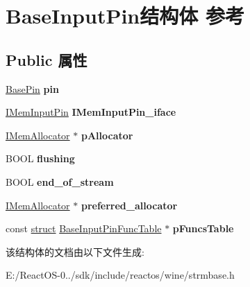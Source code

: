 \hypertarget{struct_base_input_pin}{}\section{Base\+Input\+Pin结构体 参考}
\label{struct_base_input_pin}
\subsection*{Public 属性}
\begin{DoxyCompactItemize}
\item 
\mbox{\label{struct_base_input_pin_a3de1d8566cbad1f616175c5020dbbc4a}} 
\hyperlink{struct_base_pin}{Base\+Pin} {\bfseries pin}
\item 
\mbox{\label{struct_base_input_pin_a3a11d5f666afddc2a5eb54845288313f}} 
\hyperlink{interface_i_mem_input_pin}{I\+Mem\+Input\+Pin} {\bfseries I\+Mem\+Input\+Pin\+\_\+iface}
\item 
\mbox{\label{struct_base_input_pin_a6877ac386361d331814f91efa5c76ed5}} 
\hyperlink{interface_i_mem_allocator}{I\+Mem\+Allocator} $\ast$ {\bfseries p\+Allocator}
\item 
\mbox{\label{struct_base_input_pin_adf5a3a9c33243a0f1f62c09ab4daf905}} 
B\+O\+OL {\bfseries flushing}
\item 
\mbox{\label{struct_base_input_pin_a30c49815eab0d0948d35e2f7f26a821b}} 
B\+O\+OL {\bfseries end\+\_\+of\+\_\+stream}
\item 
\mbox{\label{struct_base_input_pin_a60c23b915150b97c677b4dcbc3736e22}} 
\hyperlink{interface_i_mem_allocator}{I\+Mem\+Allocator} $\ast$ {\bfseries preferred\+\_\+allocator}
\item 
\mbox{\label{struct_base_input_pin_a1ea6f98369c04964e5689c30312525ba}} 
const \hyperlink{interfacestruct}{struct} \hyperlink{struct_base_input_pin_func_table}{Base\+Input\+Pin\+Func\+Table} $\ast$ {\bfseries p\+Funcs\+Table}
\end{DoxyCompactItemize}


该结构体的文档由以下文件生成\+:\begin{DoxyCompactItemize}
\item 
E\+:/\+React\+O\+S-\/0../sdk/include/reactos/wine/strmbase.\+h\end{DoxyCompactItemize}
